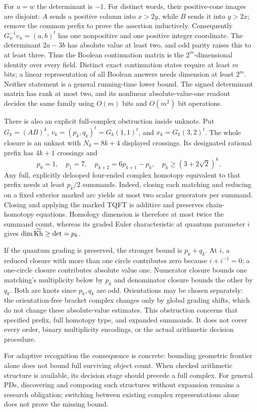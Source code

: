 For $u=w$ the determinant is $-1$.  For distinct words, their positive-cone
images are disjoint: $A$ sends a positive column into $x>2y$, while $B$ sends
it into $y>2x$; remove the common prefix to prove the assertion inductively.
Consequently $G_w^{-1}v_u=(a,b)^t$ has one nonpositive and one positive
integer coordinate.  The determinant $2a-3b$ has absolute value at least
two, and odd parity raises this to at least three.  Thus the Boolean
continuation matrix is the $2^m$-dimensional identity over every field.
Distinct exact continuation states require at least $m$ bits; a linear
representation of all Boolean answers needs dimension at least $2^m$.
Neither statement is a general running-time lower bound.  The signed
determinant matrix has rank at most two, and its nonlinear absolute-value-one
readout decides the same family using $O(m)$ bits and $O(m^2)$ bit operations.

There is also an explicit full-complex obstruction inside unknots.  Put
$G_k=(AB)^k$, $v_k=(p_k,q_k)^t=G_k(1,1)^t$, and
$x_k=G_k(3,2)^t$.  The whole closure is an unknot with $N_k=8k+4$ displayed
crossings.  Its designated rational prefix has $4k+1$ crossings and
\[
 p_0=1,\quad p_1=7,\quad p_{k+2}=6p_{k+1}-p_k,\quad
 p_k\ge(3+2\sqrt2)^k.
\]
Any full, explicitly delooped four-ended complex homotopy equivalent to that
prefix needs at least $p_k/2$ summands.  Indeed, closing each matching and
reducing on a fixed exterior marked arc yields at most two scalar generators
per summand.  Closing and applying the marked TQFT is additive and preserves
chain-homotopy equations.  Homology dimension is therefore at most twice
the summand count, whereas its graded Euler characteristic at quantum
parameter $i$ gives $\dim\widetilde{\mathrm{Kh}}\ge\det=p_k$.

If the quantum grading is preserved, the stronger bound is $p_k+q_k$.
At $i$, a reduced closure with more than one circle contributes zero because
$i+i^{-1}=0$; a one-circle closure contributes absolute value one.
Numerator closure bounds one matching's multiplicity below by $p_k$ and
denominator closure bounds the other by $q_k$.  Both are knots since $p_k,q_k$
are odd.  Orientations may be chosen separately: the orientation-free bracket
complex changes only by global grading shifts, which do not change these
absolute-value estimates.  This obstruction concerns that specified prefix,
full homotopy type, and expanded summands.  It does not cover every order,
binary multiplicity encodings, or the actual arithmetic decision procedure.

For adaptive recognition the consequence is concrete: bounding geometric
frontier alone does not bound full surviving object count.  When checked
arithmetic structure is available, its decision stage should precede a full
complex.  For general PDs, discovering and composing such structures without
expansion remains a research obligation; switching between existing complex
representations alone does not prove the missing bound.

